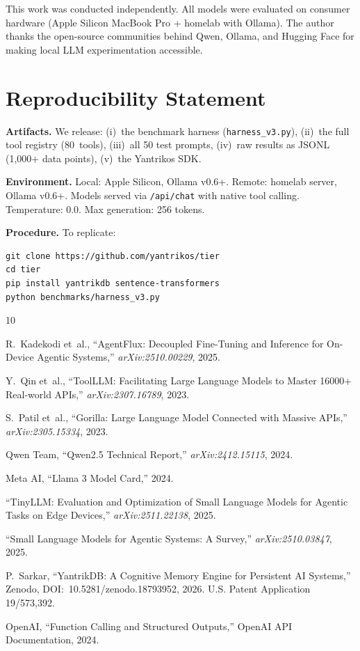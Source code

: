 \documentclass[11pt]{article}
\begin{document}
This work was conducted independently. All models were evaluated on consumer hardware (Apple Silicon MacBook Pro + homelab with Ollama). The author thanks the open-source communities behind Qwen, Ollama, and Hugging Face for making local LLM experimentation accessible.

\section*{Reproducibility Statement}

\textbf{Artifacts.} We release: (i)~the benchmark harness (\texttt{harness\_v3.py}), (ii)~the full tool registry (80~tools), (iii)~all 50 test prompts, (iv)~raw results as JSONL (1,000+ data points), (v)~the Yantrikos SDK.

\textbf{Environment.} Local: Apple Silicon, Ollama v0.6+. Remote: homelab server, Ollama v0.6+. Models served via \texttt{/api/chat} with native tool calling. Temperature: 0.0. Max generation: 256 tokens.

\textbf{Procedure.} To replicate:
\begin{verbatim}
git clone https://github.com/yantrikos/tier
cd tier
pip install yantrikdb sentence-transformers
python benchmarks/harness_v3.py
\end{verbatim}

\begin{thebibliography}{10}

R.~Kadekodi et~al., ``AgentFlux: Decoupled Fine-Tuning and Inference for On-Device Agentic Systems,'' \textit{arXiv:2510.00229}, 2025.

Y.~Qin et~al., ``ToolLLM: Facilitating Large Language Models to Master 16000+ Real-world APIs,'' \textit{arXiv:2307.16789}, 2023.

S.~Patil et~al., ``Gorilla: Large Language Model Connected with Massive APIs,'' \textit{arXiv:2305.15334}, 2023.

Qwen Team, ``Qwen2.5 Technical Report,'' \textit{arXiv:2412.15115}, 2024.

Meta AI, ``Llama 3 Model Card,'' 2024.

``TinyLLM: Evaluation and Optimization of Small Language Models for Agentic Tasks on Edge Devices,'' \textit{arXiv:2511.22138}, 2025.

``Small Language Models for Agentic Systems: A Survey,'' \textit{arXiv:2510.03847}, 2025.

P.~Sarkar, ``YantrikDB: A Cognitive Memory Engine for Persistent AI Systems,'' Zenodo, DOI:~10.5281/zenodo.18793952, 2026. U.S. Patent Application 19/573,392.

OpenAI, ``Function Calling and Structured Outputs,'' OpenAI API Documentation, 2024.

\end{thebibliography}
\end{document}
